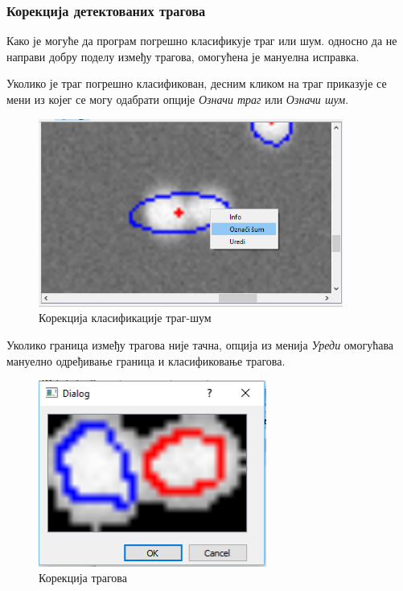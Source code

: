 \documentclass[11pt,a4paper,serbian,oneside]{book}
\begin{document}
\subsubsection{Корекција детектованих трагова}

Како је могуће да програм погрешно класификује траг или шум. односно да не направи добру поделу између трагова, омогућена је мануелна исправка.

Уколико је траг погрешно класификован, десним кликом на траг приказује се мени из којег се могу одабрати опције \textit{Означи траг} или \textit{Означи шум}.

\begin{figure}[H]
\begin{center}
\includegraphics[width=100mm]{images/oznaci.png}
\end{center}
\caption{Корекција класификације траг-шум}
\label{fig:mark}
\end{figure}

Уколико граница између трагова није тачна, опција из менија \textit{Уреди} омогућава мануелно одређивање граница и класификовање трагова.

\begin{figure}[H]
\begin{center}
\includegraphics[width=75mm]{images/uredi.png}
\end{center}
\caption{Корекција трагова}
\label{fig:mark}
\end{figure}
\end{document}
